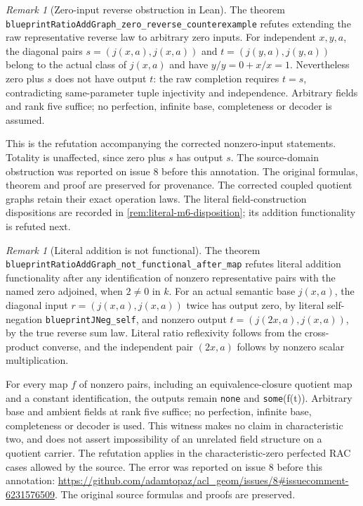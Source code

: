 \documentclass[11pt,oneside]{article}
\theoremstyle{definition}
\theoremstyle{remark}
\newtheorem{remark}[theorem]{Remark}
\newcommand{\lean}[1]{\nolinkurl{#1}}
\begin{document}
\begin{remark}[Zero-input reverse obstruction in Lean]\label{rem:literal-addition-zero-reverse}
The theorem \lean{blueprintRatioAddGraph_zero_reverse_counterexample} refutes extending
the raw representative reverse law to arbitrary zero inputs. For independent $x,y,a$,
the diagonal pairs $s=(j(x,a),j(x,a))$ and $t=(j(y,a),j(y,a))$ belong to the actual class
of $j(x,a)$ and have $y/y=0+x/x=1$. Nevertheless zero plus $s$ does not have output $t$:
the raw completion requires $t=s$, contradicting same-parameter tuple injectivity and
independence. Arbitrary fields and rank five suffice; no perfection, infinite base,
completeness or decoder is assumed.

This is the refutation accompanying the corrected nonzero-input statements. Totality
is unaffected, since zero plus $s$ has output $s$. The source-domain obstruction was
reported on issue 8 before this annotation. The original formulas, theorem and proof
are preserved for provenance. The corrected coupled quotient graphs retain their exact
operation laws. The literal field-construction dispositions are recorded in
\cref{rem:literal-m6-disposition}; its addition functionality is refuted next.
\end{remark}

\begin{remark}[Literal addition is not functional]\label{rem:literal-addition-functionality}
The theorem \lean{blueprintRatioAddGraph_not_functional_after_map} refutes literal
addition functionality after any identification of nonzero representative pairs with
the named zero adjoined, when $2\ne0$ in $k$. For an actual semantic base $j(x,a)$,
the diagonal input $r=(j(x,a),j(x,a))$ twice has output zero, by literal self-negation
\lean{blueprintJNeg_self}, and nonzero output $t=(j(2x,a),j(x,a))$, by the true reverse
sum law. Literal ratio reflexivity follows from the cross-product converse, and the
independent pair $(2x,a)$ follows by nonzero scalar multiplication.

For every map $f$ of nonzero pairs, including an equivalence-closure quotient map and
a constant identification, the outputs remain \texttt{none} and \texttt{some}(f(t)).
Arbitrary base and ambient fields at rank five suffice; no perfection, infinite base,
completeness or decoder is used. This witness makes no claim in characteristic two,
and does not assert impossibility of an unrelated field structure on a quotient carrier.
The refutation applies in the characteristic-zero perfected RAC cases allowed by the
source. The error was reported on issue 8 before this annotation:
\url{https://github.com/adamtopaz/acl_geom/issues/8#issuecomment-6231576509}.
The original source formulas and proofs are preserved.
\end{remark}
\end{document}
